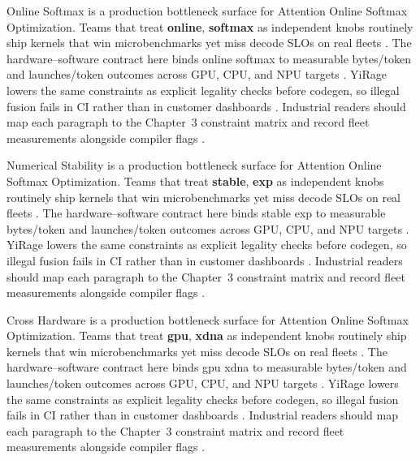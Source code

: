 Online Softmax is a production bottleneck surface for Attention Online Softmax Optimization. Teams that treat \textbf{online}, \textbf{softmax} as independent knobs routinely ship kernels that win microbenchmarks yet miss decode SLOs on real fleets \citep{dao2022flashattention,liu2024deepseekv3}. The hardware--software contract here binds online softmax to measurable bytes/token and launches/token outcomes across GPU, CPU, and NPU targets \citep{kwon2023vllm,patel2025llminference}. YiRage lowers the same constraints as explicit legality checks before codegen, so illegal fusion fails in CI rather than in customer dashboards \citep{nvidia2024cudagraphs,taxbreak2026}. Industrial readers should map each paragraph to the Chapter~3 constraint matrix and record fleet measurements alongside compiler flags \citep{liu2024deepseekv3,memoryfloor2026}.

Numerical Stability is a production bottleneck surface for Attention Online Softmax Optimization. Teams that treat \textbf{stable}, \textbf{exp} as independent knobs routinely ship kernels that win microbenchmarks yet miss decode SLOs on real fleets \citep{kwon2023vllm,patel2025llminference}. The hardware--software contract here binds stable exp to measurable bytes/token and launches/token outcomes across GPU, CPU, and NPU targets \citep{nvidia2024cudagraphs,taxbreak2026}. YiRage lowers the same constraints as explicit legality checks before codegen, so illegal fusion fails in CI rather than in customer dashboards \citep{liu2024deepseekv3,memoryfloor2026}. Industrial readers should map each paragraph to the Chapter~3 constraint matrix and record fleet measurements alongside compiler flags \citep{patel2025llminference,nvidia2022hopper}.

Cross Hardware is a production bottleneck surface for Attention Online Softmax Optimization. Teams that treat \textbf{gpu}, \textbf{xdna} as independent knobs routinely ship kernels that win microbenchmarks yet miss decode SLOs on real fleets \citep{nvidia2024cudagraphs,taxbreak2026}. The hardware--software contract here binds gpu xdna to measurable bytes/token and launches/token outcomes across GPU, CPU, and NPU targets \citep{liu2024deepseekv3,memoryfloor2026}. YiRage lowers the same constraints as explicit legality checks before codegen, so illegal fusion fails in CI rather than in customer dashboards \citep{patel2025llminference,nvidia2022hopper}. Industrial readers should map each paragraph to the Chapter~3 constraint matrix and record fleet measurements alongside compiler flags \citep{taxbreak2026,semianalysis2024tma}.

